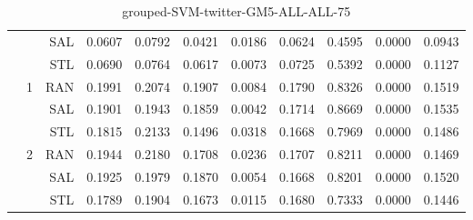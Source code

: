 \begin{center}
\begin{table}[htbp]
\begin{center}
\begin{tabular}{ | r | r | r | r | r | r | r | r | r | r | r |}
 &   & SAL & 0.0607 & 0.0792 & 0.0421 & 0.0186 & 0.0624 & 0.4595 & 0.0000 & 0.0943\\ \cline{3-11}
 &   & STL & 0.0690 & 0.0764 & 0.0617 & 0.0073 & 0.0725 & 0.5392 & 0.0000 & 0.1127\\ \cline{2-11}
 & \multirow{3}{*}{1} & RAN & 0.1991 & 0.2074 & 0.1907 & 0.0084 & 0.1790 & 0.8326 & 0.0000 & 0.1519\\ \cline{3-11}
 &   & SAL & 0.1901 & 0.1943 & 0.1859 & 0.0042 & 0.1714 & 0.8669 & 0.0000 & 0.1535\\ \cline{3-11}
 &   & STL & 0.1815 & 0.2133 & 0.1496 & 0.0318 & 0.1668 & 0.7969 & 0.0000 & 0.1486\\ \cline{2-11}
 & \multirow{3}{*}{2} & RAN & 0.1944 & 0.2180 & 0.1708 & 0.0236 & 0.1707 & 0.8211 & 0.0000 & 0.1469\\ \cline{3-11}
 &   & SAL & 0.1925 & 0.1979 & 0.1870 & 0.0054 & 0.1668 & 0.8201 & 0.0000 & 0.1520\\ \cline{3-11}
 &   & STL & 0.1789 & 0.1904 & 0.1673 & 0.0115 & 0.1680 & 0.7333 & 0.0000 & 0.1446\\ \cline{2-11}
\hline
\end{tabular}
\caption{grouped-SVM-twitter-GM5-ALL-ALL-75}
\end{center}
 \end{table}
\end{center}

